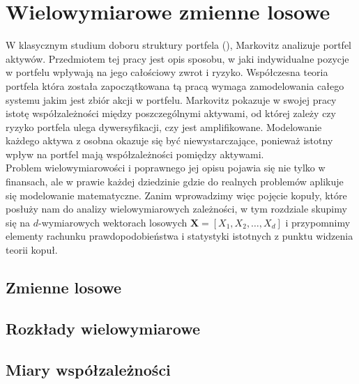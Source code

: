 \chapter{Wielowymiarowe zmienne losowe}
W klasycznym studium doboru struktury portfela (\cite{Markovitz_MPT}), Markovitz analizuje portfel aktywów. Przedmiotem tej pracy jest opis sposobu, w jaki indywidualne pozycje w portfelu wpływają na jego całościowy zwrot i ryzyko. Współczesna teoria portfela która została zapoczątkowana tą pracą wymaga zamodelowania całego systemu jakim jest zbiór akcji w portfelu. Markovitz pokazuje w swojej pracy istotę współzależności między poszczególnymi aktywami, od której zależy czy ryzyko portfela ulega dywersyfikacji, czy jest amplifikowane. Modelowanie każdego aktywa z osobna okazuje się być niewystarczające, ponieważ istotny wpływ na portfel mają współzależności pomiędzy aktywami.\\
Problem wielowymiarowości i poprawnego jej opisu pojawia się nie tylko w finansach, ale w prawie każdej dziedzinie gdzie do realnych problemów aplikuje się modelowanie matematyczne. Zanim wprowadzimy więc pojęcie kopuły, które posłuży nam do analizy wielowymiarowych zależności, w tym rozdziale skupimy się na $d$-wymiarowych wektorach losowych $\mathbf{X} = [X_1, X_2, \dots, X_d]$ i przypomnimy elementy rachunku prawdopodobieństwa i statystyki istotnych z punktu widzenia teorii kopuł.\\

\section{Zmienne losowe}
\label{sec:rozklady_laczne}


\section{Rozkłady wielowymiarowe}
\label{sec:rozklady_wielowymiarowe}


\section{Miary współzależności}
\label{sec:miary_współzależności}



\mgrclosechapter